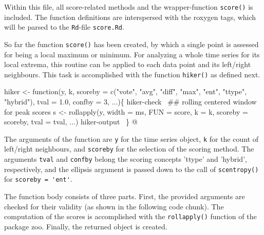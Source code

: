 \documentclass[a4paper]{article}
\newcommand{\pkg}[1]{{\fontseries{b}\selectfont #1}}
\begin{document}
Within this file, all score-related methods and the wrapper-function
\texttt{score()} is included. The function definitions are
interspersed with the roxygen tags, which will be parsed to the
\texttt{Rd}-file \texttt{score.Rd}.\par

So far the function \verb?score()? has been created, by which a single
point is assessed for being a local maximum or minimum. For analyzing
a whole time series for its local extrema, this routine can be applied
to each data point and its left/right neighbours. This task is
accomplished with the function \verb?hiker()? as defined next.

\nwenddocs{}\endmoddef
hiker <- function(y, k,
                  scoreby = c("vote", "avg", "diff", "max", "ent",
                              "ttype", "hybrid"),
                  tval = 1.0, confby = 3, ...)\{
\LA{}hiker-check~{\nwtagstyle{}}\RA{}
    ## rolling centered window for peak scores
    s <- rollapply(y, width = ms, FUN = score,
                   k = k, scoreby = scoreby, tval = tval, ...)
\LA{}hiker-output~{\nwtagstyle{}}\RA{}
\}
\nwendcode{}@

The arguments of the function are \verb?y? for the time series object,
\verb?k? for the count of left/right neighbours, and \verb?scoreby? for the
selection of the scoring method. The arguments \verb?tval? and \verb?confby?
belong the scoring concepts 'ttype' and 'hybrid', respectively, and
the ellipsis argument is passed down to the call of \verb?scentropy()?
for \verb?scoreby = 'ent'?.\par

The function body consists of three parts. First, the provided
arguments are checked for their validity (as shown in the following
code chunk). The computation of the scores is accomplished with the
\verb?rollapply()? function of the package \pkg{zoo}. Finally, the
returned object is created.\par
\end{document}
